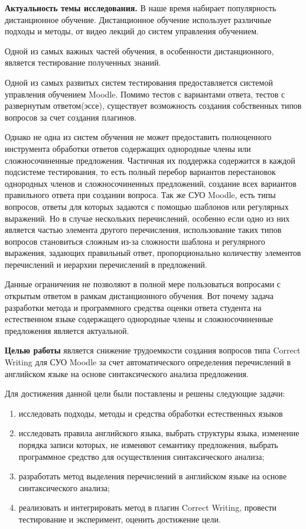 \documentclass[a4paper]{G2-105}
\begin{document}
\VSTUInitializeAvtoreferat%
\par \textbf{Актуальность темы исследования.}
В наше время набирает популярность дистанционное обучение. Дистанционное обучение использует различные подходы и методы, от видео лекций до систем управления обучением.
\par Одной из самых важных частей обучения, в особенности дистанционного, является тестирование полученных знаний.
\par Одной из самых развитых систем тестирования предоставляется системой управления обучением Moodle. Помимо тестов с вариантами
ответа, тестов с развернутым ответом(эссе), существует возможность создания собственных типов вопросов за счет создания плагинов.
\par Однако не одна из систем обучения не может предоставить полноценного инструмента обработки ответов содержащих однородные члены или сложносочиненные предложения.
Частичная их поддержка содержится в каждой подсистеме тестирования, то есть полный перебор вариантов перестановок однородных членов и сложносочиненных предложений, создание всех
вариантов правильного ответа при создании вопроса. Так же СУО Moodle, есть типы вопросов, ответы для которых задаются с помощью шаблонов или регулярных выражений.
Но в случае нескольких перечислений, особенно если одно из них является частью элемента другого перечисления, использование таких типов
вопросов становиться сложным из-за сложности шаблона и регулярного выражения, задающих правильный ответ,
пропорционально количеству элементов перечислений и иерархии перечислений в предложений.
\par Данные ограничения не позволяют в полной мере пользоваться вопросами с открытым ответом в рамкам дистанционного обучения.
Вот почему задача разработки метода и программного средства оценки ответа студента на естественном языке содержащего однородные члены и сложносочиненные предложения является актуальной.
\par \textbf{Целью работы} является снижение трудоемкости создания вопросов типа Correct Writing для
СУО Moodle за счет автоматического определения перечислений в английском языке на основе синтаксического
анализа предложения.
\par Для достижения данной цели были поставлены и решены следующие задачи:
    \begin{enumerate}
        \item исследовать подходы, методы и средства обработки естественных языков
        \item исследовать правила английского языка, выбрать структуры языка, изменение порядка записи
            которых, не изменяют семантику предложения, выбрать программное средство для осуществления
            синтаксического анализа;
        \item разработать метод выделения перечислений в английском языке на основе синтаксического
            анализа;
        \item реализовать и интегрировать метод в плагин Correct Writing, провести тестирование и
            эксперимент, оценить достижение цели.
       \end{enumerate}
\end{document}
